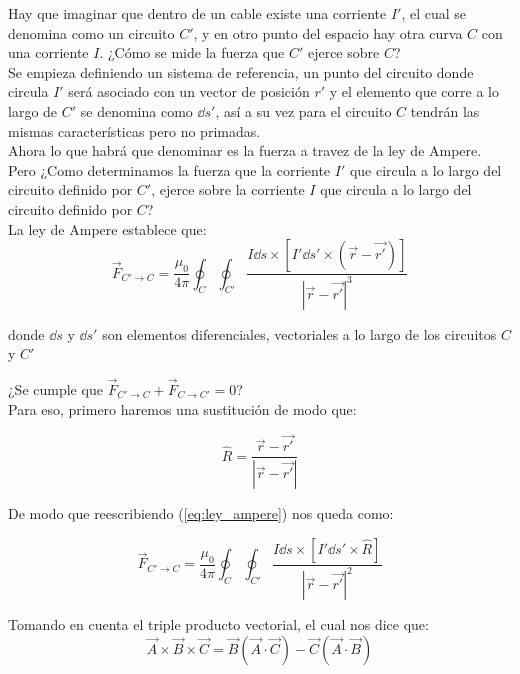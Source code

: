 \documentclass[11pt]{report}
\theoremstyle{plain}
\theoremstyle{definition}
\begin{document}
Hay que imaginar que dentro de un cable existe una corriente $I'$, el cual se denomina como un circuito $C'$, y en otro punto del espacio hay otra curva $C$ con una corriente $I$. ¿Cómo se mide la fuerza que $C'$ ejerce sobre $C$?\\
Se empieza definiendo un sistema de referencia, un punto del circuito donde circula $I'$ será asociado con un vector de posición $r'$ y el elemento que corre a lo largo de $C'$ se denomina como $\dd{s'}$, así a su vez para el circuito $C$ tendrán las mismas características pero no primadas. \\
Ahora lo que habrá que denominar es la fuerza a travez de la ley de Ampere. Pero ¿Como determinamos la fuerza que la corriente $I'$ que circula a lo largo del circuito definido por $C'$, ejerce sobre la corriente $I$ que circula a lo largo del circuito definido por $C$?\\


La ley de Ampere establece que:
\begin{equation}
	\vec{F}_{C' \rightarrow C} = \frac{\mu_0}{4\pi}
 \oint_C \oint_{C'} \frac{I \dd{s}\times[I' \dd{s'}\times (\vec{r}-\vec{r'})]}{|\vec{r}-\vec{r'}|^3}
 \label{eq:ley_ampere}
\end{equation}


donde $\dd{s}$ y $\dd{s'}$ son elementos diferenciales, vectoriales a lo largo de los circuitos $C$ y $C'$


¿Se cumple que $\vec{F}_{C' \rightarrow C} + \vec{F}_{C \rightarrow C'} = 0$?\\

Para eso, primero haremos una sustitución de modo que:

\begin{equation*} %
	\hat{R} = \frac{\vec{r}-\vec{r'}}{|\vec{r}-\vec{r'}|}
\end{equation*}

De modo que reescribiendo (\ref{eq:ley_ampere}) nos queda como:


\begin{equation*} %
	\vec{F}_{C' \rightarrow C} = \frac{\mu_0}{4\pi}
 \oint_C \oint_{C'} \frac{I \dd{s}\times[I' \dd{s'}\times \hat{R}]}{|\vec{r}-\vec{r'}|^2}
\end{equation*}


Tomando en cuenta el triple producto vectorial, el cual nos dice que:
\begin{equation} %
	\vec{A}\times\vec{B}\times\vec{C}=\vec{B}(\vec{A}\cdot \vec{C})-\vec{C}(\vec{A}\cdot \vec{B})
	\label{eq:tiple_producto_vectorial}
\end{equation}
\end{document}

